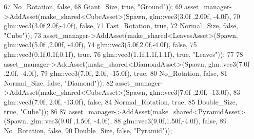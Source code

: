 \begin{DoxyCode}
67                                                          No\_Rotation, \textcolor{keyword}{false},
68                                                          Giant\_Size, \textcolor{keyword}{true}, \textcolor{stringliteral}{"Ground"}));
69         asset\_manager->AddAsset(make\_shared<CubeAsset>(Spawn, glm::vec3(3.0f ,2.00f, -4.0f),
70                                                        glm::vec3(3.0f,2.0f,-4.0f), \textcolor{keyword}{false},
71                                                        Fast\_Rotation, \textcolor{keyword}{true},
72                                                        Normal\_Size, \textcolor{keyword}{false}, \textcolor{stringliteral}{"Cube"}));
73         asset\_manager->AddAsset(make\_shared<LeavesAsset>(Spawn, glm::vec3(5.0f ,2.00f, -4.0f),
74                                                          glm::vec3(5.0f,2.0f,-4.0f), \textcolor{keyword}{false},
75                                                          glm::vec3(0.1f,0.1f,0.1f), \textcolor{keyword}{true},
76                                                          glm::vec3(1.1f,1.1f,1.1f), \textcolor{keyword}{true}, \textcolor{stringliteral}{"Leaves"}));
77                                                          
78         asset\_manager->AddAsset(make\_shared<DiamondAsset>(Spawn, glm::vec3(7.0f ,2.0f, -4.0f),
79                                                           glm::vec3(7.0f, 2.0f, -15.0f), \textcolor{keyword}{true},
80                                                           No\_Rotation, \textcolor{keyword}{false},
81                                                           Normal\_Size, \textcolor{keyword}{false}, \textcolor{stringliteral}{"Diamond"}));
82         asset\_manager->AddAsset(make\_shared<CubeAsset>(Spawn, glm::vec3(7.0f ,2.0f, -13.0f),
83                                                           glm::vec3(7.0f, 2.0f, -13.0f), \textcolor{keyword}{false},
84                                                           Normal\_Rotation, \textcolor{keyword}{true},
85                                                           Double\_Size, \textcolor{keyword}{true}, \textcolor{stringliteral}{"Cube"}));
86                                                           
87         asset\_manager->AddAsset(make\_shared<PyramidAsset>(Spawn, glm::vec3(9.0f ,1.50f, -4.0f),
88                                                           glm::vec3(9.0f,1.50f,-4.0f), \textcolor{keyword}{false},
89                                                           No\_Rotation, \textcolor{keyword}{false},
90                                                           Double\_Size, \textcolor{keyword}{false}, \textcolor{stringliteral}{"Pyramid"})); 

\end{DoxyCode}
